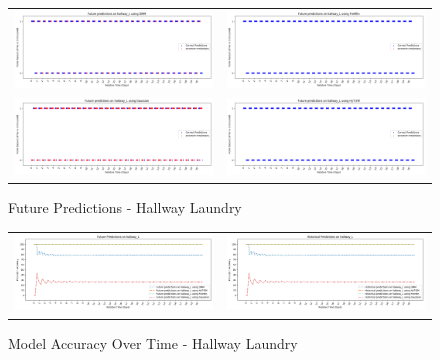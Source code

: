 \begin{figure}
  \begin{tabular}{cc}
    {\includegraphics[width = 3in]{images/results/Future_hallway_L_DMM.png}} &
    {\includegraphics[width = 3in]{images/results/Future_hallway_L_FreMEn.png}} \\
    {\includegraphics[width = 3in]{images/results/Future_hallway_L_Gaussian.png}} &
    {\includegraphics[width = 3in]{images/results/Future_hallway_L_HyT-EM.png}} \\
  \end{tabular}
  \caption{Future Predictions - Hallway Laundry}
\end{figure}

\begin{figure}
  \begin{tabular}{cc}
    {\includegraphics[width = 3in]{images/results/Future_Predictions_on_hallway_L.png}} &
    {\includegraphics[width = 3in]{images/results/Historical_Predictions_on_hallway_L.png}} \\
  \end{tabular}
  \caption{Model Accuracy Over Time - Hallway Laundry}
\end{figure}

